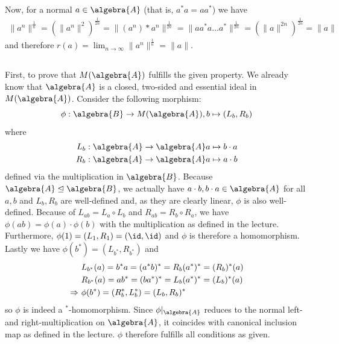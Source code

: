 \documentclass[a4paper]{article}
\begin{document}
Now, for a normal $a \in \algebra{A}$ (that is, $a^* a = a a^*$) we have
\begin{align*}
    \|a^n\|^\frac{1}{n} = \left(\|a^n\|^2\right)^\frac{1}{2n} = \|(a^n)* a^n \|^\frac{1}{2n} = \|a a^* a \dots a^*\|^\frac{1}{2n} = \left(\|a\|^{2n}\right)^\frac{1}{2n} = \|a\|
\end{align*}
and therefore $r(a) = \lim_{n \to \infty} \|a^n\|^\frac{1}{n} = \|a\|$.

\setcounter{subsection}{5}

\subsection{}

First, to prove that $M(\algebra{A})$ fulfills the given property. We already know that $\algebra{A}$ is a closed, two-sided and essential ideal in $M(\algebra{A})$.
Consider the following morphism:
\begin{equation*}
    \phi: \algebra{B} \to M(\algebra{A}), b \mapsto (L_b, R_b) 
\end{equation*}
where
\begin{align*}
    L_b: \algebra{A} \to \algebra{A} &a \mapsto b \cdot a\\
    R_b: \algebra{A} \to \algebra{A} &a \mapsto a \cdot b
\end{align*}
defined via the multiplication in $\algebra{B}$.
Because $\algebra{A} \trianglelefteq \algebra{B}$, we actually have $a \cdot b, b \cdot a \in \algebra{A}$ for all $a,b$ and $L_b, R_b$ are well-defined and, as they are clearly linear, $\phi$ is also well-defined.
Because of $L_{ab} = L_{a} \circ L_{b}$ and $R_{ab} = R_b \circ R_a$, we have $\phi(ab) = \phi(a) \cdot \phi(b)$ with the multiplication as defined in the lecture.
Furthermore, $\phi(1) = (L_1, R_1) = (\id, \id)$ and $\phi$ is therefore a homomorphism.
Lastly we have $\phi(b^*) = (L_{b^*}, R_{b^*})$ and
\begin{align*}
    & L_{b^*}(a) = b^* a = (a^* b)^* = R_b(a^*)^* = (R_b)^*(a)\\
    & R_{b^*}(a) = a b^* = (b a^*)^* = L_b(a^*)^* = (L_b)^*(a) \\
    \then \ & \phi(b^*) = (R_b^*, L_b^*) = (L_b, R_b)^*
\end{align*}
so $\phi$ is indeed a $^*$-homomorphism.
Since $\phi|_\algebra{A}$ reduces to the normal left- and right-multiplication on $\algebra{A}$, it coincides with canonical inclusion map as defined in the lecture.
$\phi$ therefore fulfills all conditions as given.
\end{document}
